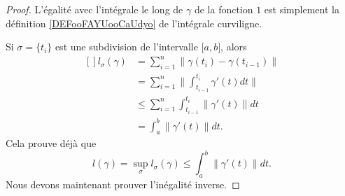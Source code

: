 \begin{proof}
    L'égalité avec l'intégrale le long de \( \gamma\) de la fonction \( 1\) est simplement la définition \ref{DEFooFAYUooCaUdyo} de l'intégrale curviligne.

    Si $\sigma=\{ t_i \}$ est une subdivision de l'intervalle $\mathopen[ a , b \mathclose]$, alors
    \begin{equation}
        \begin{aligned}[]
            l_{\sigma}(\gamma)&=\sum_{i=1}^n\| \gamma(t_i)-\gamma(t_{i-1}) \|\\
                &=\sum_{i=1}^n\| \int_{t_{i-1}}^{t_i}\gamma'(t)dt \|\\
                &\leq\sum_{i=1}^n\int_{t_{i-1}}^{t_i}\| \gamma'(t) \|dt\\
                &=\int_a^b\| \gamma'(t) \|dt.
        \end{aligned}
    \end{equation}
    Cela prouve déjà que 
    \begin{equation}        \label{Eq_0208lsigsigmmintifp}
        l(\gamma)=\sup_{\sigma}l_{\sigma}(\gamma)\leq\int_a^b\| \gamma'(t) \|dt.
    \end{equation}
    Nous devons maintenant prouver l'inégalité inverse.


\end{proof}

